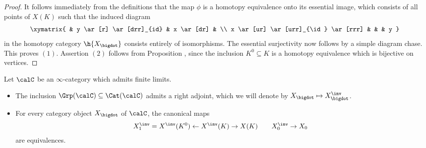 \begin{proof}
It follows immediately from the definitions that the map $\phi$ is a homotopy equivalence onto its essential image, which consists of all points of $X(K)$ such that the induced diagram
$$ \xymatrix{ & y \ar[r] \ar[drr]_{id} & x \ar[dr] & \\
x \ar[ur] \ar[urr]_{\id} \ar[rrr] & & & y }$$
in the homotopy category $\h{X_{\bigdot}}$ consists entirely of isomorphisms. The essential surjectivity
now follows by a simple diagram chase. This proves $(1)$. Assertion $(2)$ follows from Proposition , since the inclusion $K^0 \subseteq K$ is a homotopy equivalence which is bijective on vertices.
\end{proof}

\begin{proposition}\label{cavem}
Let $\calC$ be an $\infty$-category which admits finite limits.
\begin{itemize}
\item[$(1)$] The inclusion
$\Grp(\calC) \subseteq \Cat(\calC)$ admits a right adjoint, which we will denote by
$X_{\bigdot} \mapsto X_{\bigdot}^{\inv}$. 
\item[$(2)$] For every category object $X_{\bigdot}$ of $\calC$, the canonical maps
$$ X_1^{\inv} = X^{\inv}(K^0) \leftarrow X^{\inv}(K) \rightarrow X(K) \quad \quad  X_0^{\inv} \rightarrow X_0$$
are equivalences.
\end{itemize}
\end{proposition}

